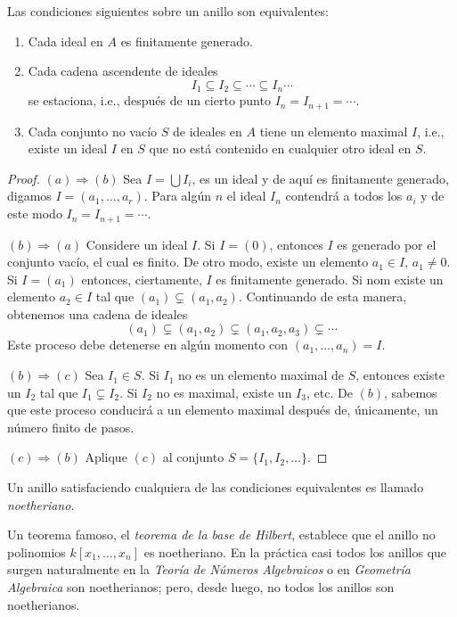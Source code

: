 \begin{lemma}
  Las condiciones siguientes sobre un anillo son equivalentes:
  \begin{enumerate}
    \item Cada ideal en $A$ es finitamente generado.
    \item Cada cadena ascendente de ideales
      \[ I_1 \subseteq I_2 \subseteq \cdots \subseteq I_n \cdots \]
      se estaciona, i.e., después de un cierto punto $I_n = I_{n+1} = \cdots$.
    \item Cada conjunto no vacío $S$ de ideales en $A$ tiene un elemento maximal $I$, i.e., existe un ideal $I$ en $S$ que no está contenido en cualquier otro ideal en $S$.
  \end{enumerate}
\end{lemma}
\begin{proof}
  $(a) \Rightarrow (b)$ Sea $ I = \bigcup I_i$, es un ideal y de aquí es finitamente generado, digamos $I = (a_1,\ldots, a_r)$. Para algún $n$ el ideal $I_n$ contendrá a todos los $a_i$ y de este modo $I_n = I_{n+1} = \cdots$.

  \nextpart
  $(b) \Rightarrow (a)$ Considere un ideal $I$. Si $I = (0)$, entonces $I$ es generado por el conjunto vacío, el cual es finito. De otro modo, existe un elemento $a_1 \in I$, $a_1 \neq 0$. Si $I = (a_1)$ entonces, ciertamente, $I$ es finitamente generado. Si nom existe un elemento $a_2 \in I$ tal que $(a_1) \subsetneq (a_1, a_2)$. Continuando de esta manera, obtenemos una cadena de ideales
  \[
    (a_1) \subsetneq (a_1, a_2) \subsetneq (a_1,a_2,a_3) \subsetneq \cdots
  \]
  Este proceso debe detenerse en algún momento con $(a_1,\ldots,a_n) = I$.

  \nextpart
  $(b)\Rightarrow (c)$ Sea $I_1 \in S$. Si $I_1$ no es un elemento maximal de $S$, entonces existe un $I_2$ tal que $I_1 \subsetneq I_2$. Si $I_2$ no es maximal, existe un $I_3$, etc. De $(b)$, sabemos que este proceso conducirá a un elemento maximal después de, únicamente, un número finito de pasos.

  \nextpart
  $(c)\Rightarrow (b)$ Aplique $(c)$ al conjunto $S = \{I_1,I_2,\ldots\}$.
\end{proof}

Un anillo satisfaciendo cualquiera de las condiciones equivalentes es llamado \emph{noetheriano}.

Un teorema famoso, el \emph{teorema de la base de Hilbert}, establece que el anillo no polinomios $k[x_1,\ldots,x_n]$ es noetheriano. En la práctica casi todos los anillos que surgen naturalmente en la \emph{Teoría de Números Algebraicos} o en \emph{Geometría Algebraica} son noetherianos; pero, desde luego, no todos los anillos son noetherianos.

